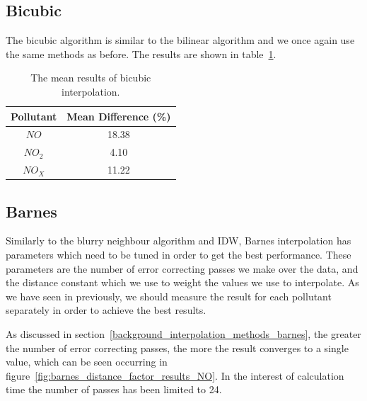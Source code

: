         \subsection{Bicubic}\label{prediction_evaluation_results_bicubic}


			The bicubic algorithm is similar to the bilinear algorithm and we once again use the same methods as before. The results are shown in table~\ref{tab:bicubic_results}.

        	\begin{table}
				\centering
	    		\begin{tabular}{|c|c|}
	    			\hline
					Pollutant & Mean Difference (\%) \\ \hline
					$NO$ & 18.38 \\
					$NO_{2}$ & 4.10 \\
					$NO_{X}$ & 11.22 \\
					\hline
				\end{tabular}
				\caption{The mean results of bicubic interpolation.}
				\label{tab:bicubic_results}
			\end{table} 

        \subsection{Barnes}\label{prediction_evaluation_results_barnes}


        	Similarly to the blurry neighbour algorithm and IDW, Barnes interpolation has parameters which need to be tuned in order to get the best performance. These parameters are the number of error correcting passes we make over the data, and the distance constant which we use to weight the values we use to interpolate. As we have seen in previously, we should measure the result for each pollutant separately in order to achieve the best results. 

        	As discussed in section~\ref{background_interpolation_methods_barnes}, the greater the number of error correcting passes, the more the result converges to a single value, which can be seen occurring in figure~\ref{fig:barnes_distance_factor_results_NO}. In the interest of calculation time the number of passes has been limited to 24. 


